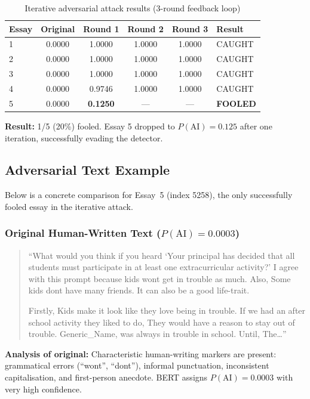 \documentclass[11pt,a4paper]{article}
\begin{document}
\begin{table}[H]
\centering
\caption{Iterative adversarial attack results (3-round feedback loop)}
\label{tab:iterative}
\begin{tabular}{lccccl}
\toprule
\textbf{Essay} & \textbf{Original} & \textbf{Round 1} & \textbf{Round 2} & \textbf{Round 3} & \textbf{Result} \\
\midrule
1 & 0.0000 & 1.0000 & 1.0000 & 1.0000 & CAUGHT \\
2 & 0.0000 & 1.0000 & 1.0000 & 1.0000 & CAUGHT \\
3 & 0.0000 & 1.0000 & 1.0000 & 1.0000 & CAUGHT \\
4 & 0.0000 & 0.9746 & 1.0000 & 1.0000 & CAUGHT \\
5 & 0.0000 & \textbf{0.1250} & --- & --- & \textbf{FOOLED} \\
\bottomrule
\end{tabular}
\end{table}

\textbf{Result:} 1/5 (20\%) fooled. Essay 5 dropped to $P(\text{AI})=0.125$ after one iteration, successfully evading the detector.

\subsection{Adversarial Text Example}

Below is a concrete comparison for Essay~5 (index 5258), the only successfully fooled essay in the iterative attack.

\subsubsection*{Original Human-Written Text ($P(\text{AI})=0.0003$)}

\begin{quote}
``What would you think if you heard `Your principal has decided that all students must participate in at least one extracurricular activity?' 
I agree with this prompt because kids wont get in trouble as much. Also, Some kids dont have many friends. It can also be a good life-trait.

Firstly, Kids make it look like they love being in trouble. If we had an after school activity they liked to do, They would have a reason to stay out of trouble. Generic\_Name, was always in trouble in school. Until, The\ldots''
\end{quote}

\textbf{Analysis of original:} Characteristic human-writing markers are present: grammatical errors (``wont'', ``dont''), informal punctuation, inconsistent capitalisation, and first-person anecdote. BERT assigns $P(\text{AI})=0.0003$ with very high confidence.
\end{document}
